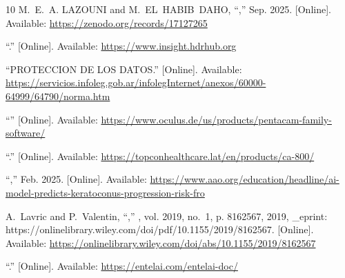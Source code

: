 \begin{thebibliography}{10}
\BIBentryALTinterwordspacing
M.~E.~A. LAZOUNI and M.~EL~HABIB~DAHO, ``,'' Sep. 2025. [Online].
  Available: \url{https://zenodo.org/records/17127265}
\BIBentrySTDinterwordspacing

\BIBentryALTinterwordspacing
``.'' [Online]. Available:
  \url{https://www.insight.hdrhub.org}
\BIBentrySTDinterwordspacing

\BIBentryALTinterwordspacing
``{PROTECCION} {DE} {LOS} {DATOS}.'' [Online]. Available:
  \url{https://servicios.infoleg.gob.ar/infolegInternet/anexos/60000-64999/64790/norma.htm}
\BIBentrySTDinterwordspacing

\BIBentryALTinterwordspacing
``'' [Online]. Available:
  \url{https://www.oculus.de/us/products/pentacam-family-software/}
\BIBentrySTDinterwordspacing

\BIBentryALTinterwordspacing
``.'' [Online]. Available:
  \url{https://topconhealthcare.lat/en/products/ca-800/}
\BIBentrySTDinterwordspacing

\BIBentryALTinterwordspacing
``,'' Feb. 2025. [Online]. Available:
  \url{https://www.aao.org/education/headline/ai-model-predicts-keratoconus-progression-risk-fro}
\BIBentrySTDinterwordspacing

\BIBentryALTinterwordspacing
A.~Lavric and P.~Valentin, ``,'' \emph{}, vol. 2019, no.~1, p. 8162567, 2019, \_eprint:
  https://onlinelibrary.wiley.com/doi/pdf/10.1155/2019/8162567. [Online].
  Available: \url{https://onlinelibrary.wiley.com/doi/abs/10.1155/2019/8162567}
\BIBentrySTDinterwordspacing

\BIBentryALTinterwordspacing
``.'' [Online]. Available:
  \url{https://entelai.com/entelai-doc/}
\BIBentrySTDinterwordspacing


\end{thebibliography}
